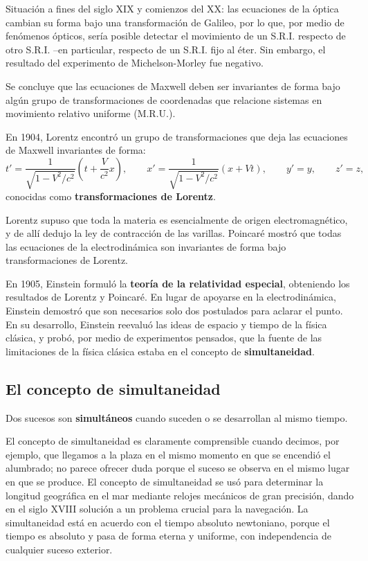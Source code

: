 Situación a fines del siglo XIX y comienzos del XX: las ecuaciones de la
óptica cambian su forma bajo una transformación de Galileo, por lo que,
por medio de fenómenos ópticos, sería posible detectar el movimiento de
un S.R.I. respecto de otro S.R.I. --en particular, respecto de un S.R.I.
fijo al éter. Sin embargo, el resultado del experimento de
Michelson-Morley fue negativo.

Se concluye que las ecuaciones de Maxwell deben ser invariantes de
forma bajo algún grupo de transformaciones de coordenadas que relacione
sistemas en movimiento relativo uniforme (M.R.U.).

\begin{definicion}
En 1904, Lorentz encontró un grupo de transformaciones que deja las
ecuaciones de Maxwell invariantes de forma:
\[
t' = \frac{1}{\sqrt{1-V^2/c^2}}\left(t+\frac{V}{c^2}x\right), \qquad
x' = \frac{1}{\sqrt{1-V^2/c^2}}(x+Vt), \qquad y'=y, \qquad z'=z,
\]
conocidas como \textbf{transformaciones de Lorentz}.
\end{definicion}

\begin{observacion}
Lorentz supuso que toda la materia es esencialmente de origen
electromagnético, y de allí dedujo la ley de contracción de las
varillas. Poincaré mostró que todas las ecuaciones de la electrodinámica
son invariantes de forma bajo transformaciones de Lorentz.

En 1905, Einstein formuló la \textbf{teoría de la relatividad especial},
obteniendo los resultados de Lorentz y Poincaré. En lugar de apoyarse en
la electrodinámica, Einstein demostró que son necesarios solo dos
postulados para aclarar el punto. En su desarrollo, Einstein reevaluó
las ideas de espacio y tiempo de la física clásica, y probó, por medio
de experimentos pensados, que la fuente de las limitaciones de la física
clásica estaba en el concepto de \textbf{simultaneidad}.
\end{observacion}

\subsection{El concepto de simultaneidad}

\begin{definicion}[Simultaneidad]
Dos sucesos son \textbf{simultáneos} cuando suceden o se desarrollan al
mismo tiempo.
\end{definicion}

El concepto de simultaneidad es claramente comprensible cuando decimos,
por ejemplo, que llegamos a la plaza en el mismo momento en que se
encendió el alumbrado; no parece ofrecer duda porque el suceso se
observa en el mismo lugar en que se produce. El concepto de
simultaneidad se usó para determinar la longitud geográfica en el mar
mediante relojes mecánicos de gran precisión, dando en el siglo XVIII
solución a un problema crucial para la navegación. La simultaneidad
está en acuerdo con el tiempo absoluto newtoniano, porque el tiempo es
absoluto y pasa de forma eterna y uniforme, con independencia de
cualquier suceso exterior.

